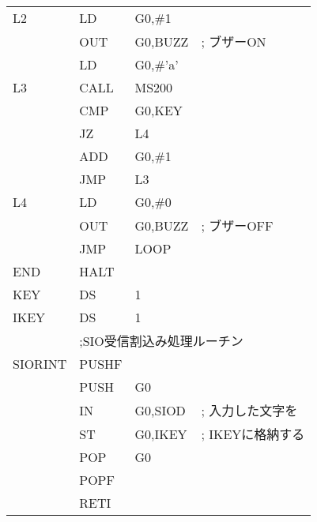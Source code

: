 \begin{center}
{\begin{tabular}{|l|l l l|}
L2      & LD      & G0,\#1         & \\
        & OUT     & G0,BUZZ        & ; ブザーON\\
        & LD      & G0,\#'a'       & \\
L3      & CALL    & MS200          & \\
        & CMP     & G0,KEY         & \\
        & JZ      & L4             & \\
        & ADD     & G0,\#1         & \\
        & JMP     & L3             & \\
L4      & LD      & G0,\#0         & \\
        & OUT     & G0,BUZZ        & ; ブザーOFF\\
        & JMP     & LOOP           & \\
END     & HALT    &                & \\
KEY     & DS      & 1              & \\
IKEY    & DS      & 1              & \\
        & \multicolumn{3}{|l|}{;SIO受信割込み処理ルーチン} \\
SIORINT & PUSHF   &                & \\
        & PUSH    & G0             & \\
        & IN      & G0,SIOD        & ; 入力した文字を\\
        & ST      & G0,IKEY        & ; IKEYに格納する\\
        & POP     & G0             & \\
        & POPF    &                & \\
        & RETI    &                & \\
\hline
\end{tabular}
}
\end{center}

\vfill
\begin{center}
\end{center}

